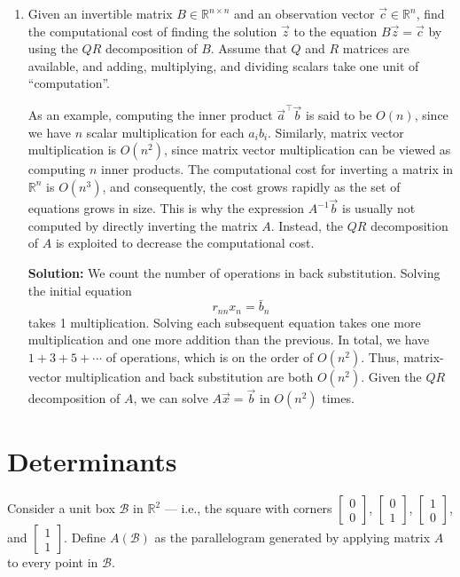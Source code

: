\documentclass[10pt]{article}
\theoremstyle{definition}
\theoremstyle{plain}
\newcommand{\RR}{\mathbb{R}}
\newcommand{\vv}[1]{\vec{#1}}
\begin{document}
\begin{enumerate}[label=(\alph*)]
\item Given an invertible matrix $B \in \RR^{n \times n}$ and an observation vector $\vv{c} \in \RR^n$, find the computational cost of finding the solution $\vv{z}$ to the equation $B\vv{z} = \vv{c}$ by using the $QR$ decomposition of $B$. Assume that $Q$ and $R$ matrices are available, and adding, multiplying, and dividing scalars take one unit of ``computation''.

As an example, computing the inner product $\vv{a}^\top \vv{b}$ is said to be $O(n)$, since we have $n$ scalar multiplication for each $a_i b_i$. Similarly, matrix vector multiplication is $O(n^2)$, since matrix vector multiplication can be viewed as computing $n$ inner products. The computational cost for inverting a matrix in $\RR^n$ is $O(n^3)$, and consequently, the cost grows rapidly as the set of equations grows in size. This is why the expression $A^{-1}\vv{b}$ is usually not computed by directly inverting the matrix $A$. Instead, the $QR$ decomposition of $A$ is exploited to decrease the computational cost.

\textbf{Solution:} We count the number of operations in back substitution. Solving the initial equation
\begin{equation}
r_{nn} x_n = \bar{b}_n
\end{equation}
takes 1 multiplication. Solving each subsequent equation takes one more multiplication and one more addition than the previous. In total, we have $1 + 3 + 5 + \cdots$ of operations, which is on the order of $O(n^2)$. Thus, matrix-vector multiplication and back substitution are both $O(n^2)$. Given the $QR$ decomposition of $A$, we can solve $A\vv{x} = \vv{b}$ in $O(n^2)$ times.
\end{enumerate}

\section{Determinants}

Consider a unit box $\mathcal{B}$ in $\RR^2$ --- i.e., the square with corners $\begin{bmatrix} 0 \\ 0 \end{bmatrix}$, $\begin{bmatrix} 0 \\ 1 \end{bmatrix}$, $\begin{bmatrix} 1 \\ 0 \end{bmatrix}$, and $\begin{bmatrix} 1 \\ 1 \end{bmatrix}$. Define $A(\mathcal{B})$ as the parallelogram generated by applying matrix $A$ to every point in $\mathcal{B}$.
\end{document}
